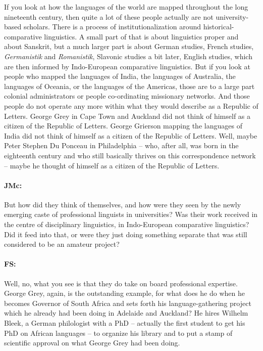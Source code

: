 \documentclass[output=paper]{langscibook}
\begin{document}
If you look at how the languages of the world are mapped throughout the long nineteenth century, then quite a lot of these people actually are not university-based scholars. There is a process of institutionalization around historical-com\-par\-a\-tive linguistics. A small part of that is about linguistics proper and about Sanskrit, but a much larger part is about German studies, French studies, \textit{Germanistik} and \textit{Romanistik}, Slavonic studies a bit later, English studies, which are then informed by Indo-European comparative linguistics. But if you look at people who mapped the languages of India, the languages of Australia, the languages of Oceania, or the languages of the Americas, those are to a large part colonial administrators or people co-ordinating missionary networks. And those people do not operate any more within what they would describe as a Republic of Letters. George Grey in Cape Town and Auckland did not think of himself as a citizen of the Republic of Letters. George Grierson mapping the languages of India did not think of himself as a citizen of the Republic of Letters. Well, maybe Peter Stephen Du Ponceau in Philadelphia – who, after all, was born in the eighteenth century and who still basically thrives on this correspondence network – maybe he thought of himself as a citizen of the Republic of Letters.


\paragraph*{JMc:}  But how did they think of themselves, and how were they seen by the newly emerging caste of professional linguists in universities? Was their work received in the centre of disciplinary linguistics, in Indo-European comparative linguistics? Did it feed into that, or were they just doing something separate that was still considered to be an amateur project?


\paragraph*{FS:}  Well, no, what you see is that they do take on board professional expertise. George Grey, again, is the outstanding example, for what does he do when he becomes Governor of South Africa and sets forth his language-gathering project which he already had been doing in Adelaide and Auckland? He hires Wilhelm Bleek, a German philologist with a PhD – actually the first student to get his PhD on African languages – to organize his library and to put a stamp of scientific approval on what George Grey had been doing.
\end{document}
